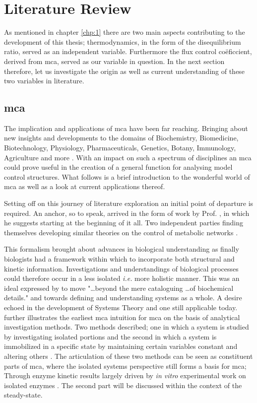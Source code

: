 \chapter{Literature Review}
\label{chp:2}
As mentioned in chapter \ref{chp:1} there are two main aspects contributing to the development of this thesis; thermodynamics, in the form of the disequilibrium ratio, served as an independent variable. Furthermore the flux control co\"eficcient, derived from \gls{mca}, served as our variable in question. In the next section therefore, let us investigate the origin as well as current understanding of these two variables in literature.

\section{\gls{mca}}
The implication and applications of \gls{mca} have been far reaching. Bringing about new insights and developments to the domains of Biochemistry, Biomedicine, Biotechnology, Physiology, Pharmaceuticals, Genetics, Botany, Immunology, Agriculture and more \citep{Kacser1981, Sorribas1995, Holms1996, Cornish1999, Boren2002, Cascante2002, Olivier2004, Weselake2008}. With an impact on such a spectrum of disciplines an \gls{mca} could prove useful in the creation of a general function for analysing model control structures. What follows is a brief introduction to the wonderful world of \gls{mca} as well as a look at current applications thereof.

Setting off on this journey of literature exploration an initial point of departure is required. An anchor, so to speak, arrived in the form of work by Prof. \citeauthor{Hofmeyr2001}, in which he suggests starting at the beginning of it all. Two independent parties finding themselves developing similar theories on the control of metabolic networks \citep{Rapoport1974, Kacser1973,Hofmeyr2001}.

This formalism brought about advances in biological understanding as finally biologists had a framework within which to incorporate both structural and kinetic information. Investigations and understandings of biological processes could therefore occur in a less isolated \textit{i.e.} more holistic manner. This was an ideal expressed by \citeauthor{Kacser1968} to move "\ldots beyond the mere cataloguing \ldots of biochemical details." and towards defining and understanding systems as a whole. A desire echoed in the development of Systems Theory and one still applicable today. \citeauthor{Kacser1968} further  illustrates the earliest \gls{mca} intuition for \gls{mca} on the basis of analytical investigation methods. Two methods described; one in which a system is studied by investigating isolated portions and the second in which a system is immobilized in a specific state by maintaining certain variables constant and altering others \citep{Kacser1968}. The articulation of these two methods can be seen as constituent parts of \gls{mca}, where the isolated systems perspective still forms a basis for \gls{mca}; Through enzyme kinetic results largely driven by \textit{in vitro} experimental work on isolated enzymes \citep{Hynne2001, Boren2002}. The second part will be discussed within the context of the \gls{steady-state}. 

